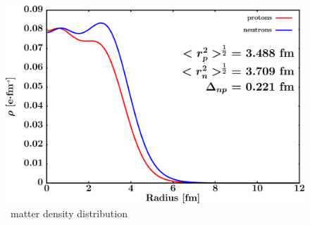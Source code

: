 \begin{figure}[hbtp]
    \centering
    \begin{minipage}{0.70\textwidth}
        \centering
        \includegraphics[width=\linewidth]{figures/ca48_matterDensity.png}
        \caption*{\caEight\ matter density distribution}
        \label{DOMFitData_ca48_matterDensity}
    \end{minipage}
\end{figure}

